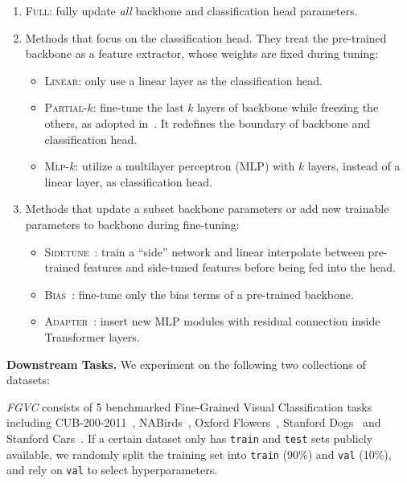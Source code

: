 \begin{enumerate}[nosep, label=(\alph*), font=\small\ttbf,] 
\item \textsc{Full}: fully update \emph{all} backbone and classification head parameters.

\item Methods that focus on the classification head. They treat the pre-trained backbone as a feature extractor, whose weights are fixed during tuning:
\begin{itemize}[leftmargin=0.0em, topsep=0.15mm]
    \item \textsc{Linear}: only use a linear layer as the classification head.
    \item \textsc{Partial}-$k$: fine-tune the last $k$ layers of backbone while freezing the others, as adopted in~\cite{yosinski2014transferable,zhang2016colorful,noroozi2016unsupervised,he2021mae}. It redefines the boundary of backbone and classification head.
    \item \textsc{Mlp}-$k$: utilize a  multilayer perceptron (MLP) with $k$ layers, instead of a linear layer, as classification head.
\end{itemize}

\item Methods that update a subset backbone parameters or add new trainable parameters to backbone during fine-tuning:
\begin{itemize}[leftmargin=0.0em, topsep=0.15mm]
\item \textsc{Sidetune}~\cite{zhang2020side}: train a ``side'' network and linear interpolate between pre-trained features and side-tuned features before being fed into the head.
\item \textsc{Bias}~\cite{cai2020tinytl,zaken2021bitfit}: fine-tune only the bias terms of a pre-trained backbone.
\item \textsc{Adapter}~\cite{houlsby2019parameter,pfeiffer2020adapterfusion,pfeiffer2020AdapterHub}: insert new MLP modules with residual connection inside Transformer layers. 
\end{itemize}
\end{enumerate}

\textbf{Downstream Tasks.} We experiment on the following two collections of datasets:

\textit{FGVC} consists of 5 benchmarked Fine-Grained Visual Classification tasks including CUB-200-2011~\cite{WahCUB_200_2011}, NABirds~\cite{van2015nabirds}, Oxford Flowers~\cite{nilsback2008automated}, Stanford Dogs~\cite{Khosla_FGVC2011dogs} and Stanford Cars~\cite{gebru2017cars}. If a certain dataset only has {\small\texttt{train}} and {\small\texttt{test}} sets publicly available, we randomly split the training set into {\small\texttt{train}} (90\%) and {\small\texttt{val}} (10\%), and rely on {\small\texttt{val}} to select hyperparameters.

